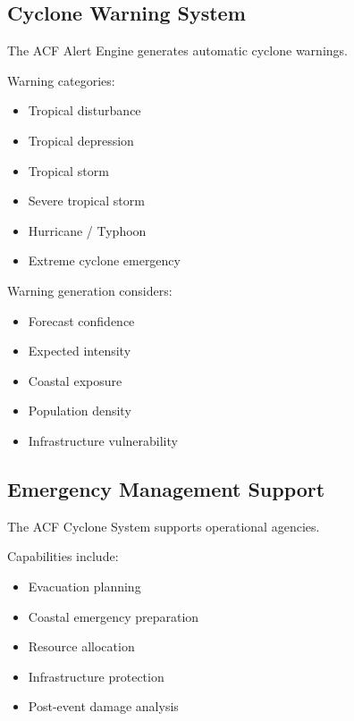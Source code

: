 \subsection{Cyclone Warning System}

The ACF Alert Engine generates automatic cyclone warnings.

Warning categories:

\begin{itemize}

\item Tropical disturbance

\item Tropical depression

\item Tropical storm

\item Severe tropical storm

\item Hurricane / Typhoon

\item Extreme cyclone emergency

\end{itemize}


Warning generation considers:

\begin{itemize}

\item Forecast confidence

\item Expected intensity

\item Coastal exposure

\item Population density

\item Infrastructure vulnerability

\end{itemize}



\subsection{Emergency Management Support}

The ACF Cyclone System supports operational agencies.

Capabilities include:

\begin{itemize}

\item Evacuation planning

\item Coastal emergency preparation

\item Resource allocation

\item Infrastructure protection

\item Post-event damage analysis

\end{itemize}


